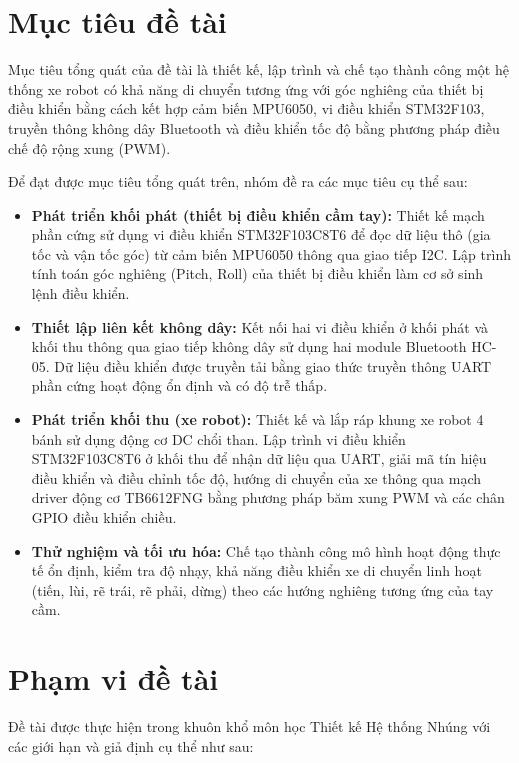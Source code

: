 \section{Mục tiêu đề tài}
Mục tiêu tổng quát của đề tài là thiết kế, lập trình và chế tạo thành công một hệ thống xe robot có khả năng di chuyển tương ứng với góc nghiêng của thiết bị điều khiển bằng cách kết hợp cảm biến MPU6050, vi điều khiển STM32F103, truyền thông không dây Bluetooth và điều khiển tốc độ bằng phương pháp điều chế độ rộng xung (PWM).

Để đạt được mục tiêu tổng quát trên, nhóm đề ra các mục tiêu cụ thể sau:
\begin{itemize}
    \item \textbf{Phát triển khối phát (thiết bị điều khiển cầm tay):} Thiết kế mạch phần cứng sử dụng vi điều khiển STM32F103C8T6 để đọc dữ liệu thô (gia tốc và vận tốc góc) từ cảm biến MPU6050 thông qua giao tiếp I2C. Lập trình tính toán góc nghiêng (Pitch, Roll) của thiết bị điều khiển làm cơ sở sinh lệnh điều khiển.
    \item \textbf{Thiết lập liên kết không dây:} Kết nối hai vi điều khiển ở khối phát và khối thu thông qua giao tiếp không dây sử dụng hai module Bluetooth HC-05. Dữ liệu điều khiển được truyền tải bằng giao thức truyền thông UART phần cứng hoạt động ổn định và có độ trễ thấp.
    \item \textbf{Phát triển khối thu (xe robot):} Thiết kế và lắp ráp khung xe robot 4 bánh sử dụng động cơ DC chổi than. Lập trình vi điều khiển STM32F103C8T6 ở khối thu để nhận dữ liệu qua UART, giải mã tín hiệu điều khiển và điều chỉnh tốc độ, hướng di chuyển của xe thông qua mạch driver động cơ TB6612FNG bằng phương pháp băm xung PWM và các chân GPIO điều khiển chiều.
    \item \textbf{Thử nghiệm và tối ưu hóa:} Chế tạo thành công mô hình hoạt động thực tế ổn định, kiểm tra độ nhạy, khả năng điều khiển xe di chuyển linh hoạt (tiến, lùi, rẽ trái, rẽ phải, dừng) theo các hướng nghiêng tương ứng của tay cầm.
\end{itemize}

\section{Phạm vi đề tài}
Đề tài được thực hiện trong khuôn khổ môn học Thiết kế Hệ thống Nhúng với các giới hạn và giả định cụ thể như sau:

